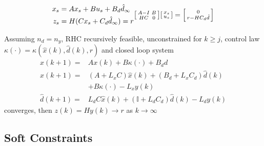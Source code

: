 \begin{align*}
	\begin{aligned}
		x_s & = Ax_s + Bu_s +B_d\hat{d}_\infty  \\
		z_s & = H(Cx_s + C_d\hat{d}_\infty) = r
	\end{aligned}
	\begin{aligned}
		\begin{bsmallmatrix}
			A-I & B \\
			HC  & 0
		\end{bsmallmatrix}
		\begin{bsmallmatrix}
			x_s \\
			u_s
		\end{bsmallmatrix}
		=
		\begin{bsmallmatrix}
			0 \\
			r-HC_d\hat{d}
		\end{bsmallmatrix}
	\end{aligned}
\end{align*}





\begin{theorem}
	Assuming
	$n_d = n_y$,
	RHC recursively feasible,
	unconstrained for $k \geq j$,
	control law  $\kappa(\cdot)= \kappa(\hat{x}(k),\hat{d}(k),r)$
	and closed loop system
	\begin{align*}
		x(k+1)        = & Ax(k) + B\kappa(\cdot) + B_d d                                 \\
		\hat{x}(k+1)  = & (A + L_x C)\hat{x}(k) + (B_d + L_x C_d)\hat{d}(k)              \\
		                & + B\kappa(\cdot) - L_x y(k)                                    \\
		\hat{d}(k+1)  = & L_d C \hat{x}(k) + (\mathbb{I} + L_d C_d)\hat{d}(k) - L_d y(k)
	\end{align*}
	converges, then $z(k) = Hy(k) \to r$
	as $k\to\infty$
\end{theorem}



\subsection{Soft Constraints}

